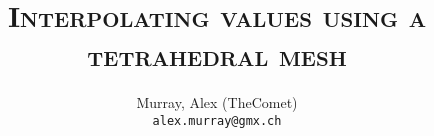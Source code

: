 \author{%
    Murray, Alex (TheComet)\\
    \texttt{alex.murray@gmx.ch}
}

\title{%
    \Huge{\textsc{Interpolating values using a tetrahedral mesh}} \\
    \vspace{5mm}
}


